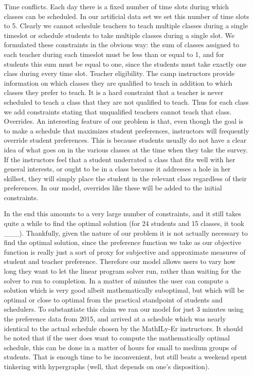 \documentclass[11pt]{article}
\begin{document}
	Time conflicts.  Each day there is a fixed number of time slots during which classes can be scheduled. In our artificial data set we set this number of time slots to 5. Clearly we cannot schedule teachers to teach multiple classes during a single timeslot or schedule students to take multiple classes during a single slot. We formulated these constraints in the obvious way: the sum of classes assigned to each teacher during each timeslot must be less than or equal to 1, and for students this sum must be equal to one, since the students must take exactly one class during every time slot.
	Teacher eligibility. The camp instructors provide information on which classes they are qualified to teach in addition to which classes they prefer to teach. It is a hard constraint that a teacher is never scheduled to teach a class that they are not qualified to teach. Thus for each class we add constraints stating that unqualified teachers cannot teach that class.
	Overrides. An interesting feature of our problem is that, even though the goal is to make a schedule that maximizes student preferences, instructors will frequently override student preferences. This is because students usually do not have a clear idea of what goes on in the various classes at the time when they take the survey. If the instructors feel that a student underrated a class that fits well with her general interests, or ought to be in a class because it addresses a hole in her skillset, they will simply place the student in the relevant class regardless of their preferences. In our model, overrides like these will be added to the initial constraints.

	In the end this amounts to a very large number of constraints, and it still takes quite a while to find the optimal solution (for 24 students and 15 classes, it took ___). Thankfully, given the nature of our problem it is not actually necessary to find the optimal solution, since the preference function we take as our objective function is really just a sort of proxy for subjective and approximate measures of student and teacher preference. Therefore our model allows users to vary how long they want to let the linear program solver run, rather than waiting for the solver to run to completion. In a matter of minutes the user can compute a solution which is very good albeit mathematically suboptimal, but which will be optimal or close to optimal from the practical standpoint of students and schedulers. To substantiate this claim we ran our model for just 3 minutes using the preference data from 2015, and arrived at a schedule which was nearly identical to the actual schedule chosen by the MathILy-Er instructors.
	It should be noted that if the user does want to compute the mathematically optimal schedule, this can be done in a matter of hours for small to medium groups of students.  That is enough time to be inconvenient, but still beats a weekend spent tinkering with hypergraphs (well, that depends on one’s disposition).
\end{document}
